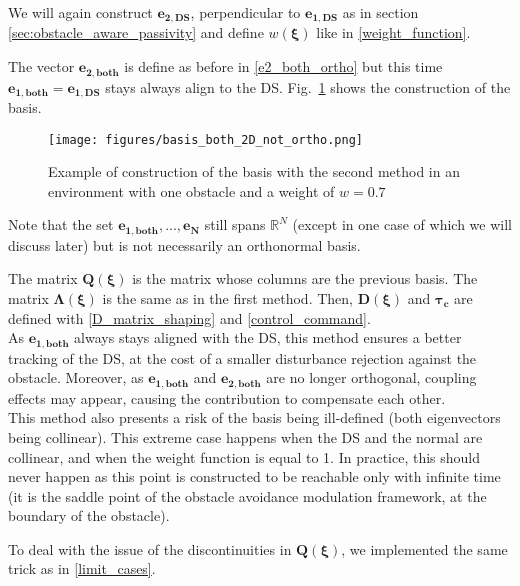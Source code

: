 We will again construct $\boldsymbol{e_{2,DS}}$, perpendicular to $\boldsymbol{e_{1,DS}}$ as in section \ref{sec:obstacle_aware_passivity} and define $w(\boldsymbol\xi)$ like in \eqref{weight_function}.

The vector $\boldsymbol{e_{2,both}}$ is define as before in \eqref{e2_both_ortho} but this time $\boldsymbol{e_{1,both}} = \boldsymbol{e_{1,DS}}$ stays always align to the DS. Fig.~\ref{fig_basis_both_2D_not_ortho} shows the construction of the basis. \\

\begin{figure}
\centerline{\texttt{[image: figures/basis\_both\_2D\_not\_ortho.png]}}
\caption{Example of construction of the basis with the second method in an environment with one obstacle and a weight of $w = 0.7$}
\label{fig_basis_both_2D_not_ortho}
\end{figure}

Note that the set $\boldsymbol{e_{1,both}}, ..., \boldsymbol{e_N}$ still spans $\mathbb{R}^N$ (except in one case of which we will discuss later) but is not necessarily an orthonormal basis.

The matrix $\boldsymbol Q(\boldsymbol\xi)$ is the matrix whose columns are the previous basis. The matrix $\boldsymbol\Lambda(\boldsymbol\xi)$ is the same as in the first method. Then, $\boldsymbol D(\boldsymbol\xi)$ and $\boldsymbol{\tau_c}$ are defined with \eqref{D_matrix_shaping} and \eqref{control_command}.\\

As $\boldsymbol{e_{1,both}}$ always stays aligned with the DS, this method ensures a better tracking of the DS, at the cost of a smaller disturbance rejection against the obstacle. Moreover, as $\boldsymbol{e_{1,both}}$ and $\boldsymbol{e_{2,both}}$ are no longer orthogonal, coupling effects may appear, causing the contribution to compensate each other. \\

This method also presents a risk of the basis being ill-defined (both eigenvectors being collinear). This extreme case happens when the DS and the normal are collinear, and when the weight function is equal to 1. In practice, this should never happen as this point is constructed to be reachable only with infinite time (it is the saddle point of the obstacle avoidance modulation framework, at the boundary of the obstacle).

To deal with the issue of the discontinuities in $\boldsymbol Q(\boldsymbol\xi)$, we implemented the same trick as in \ref{limit_cases}.

